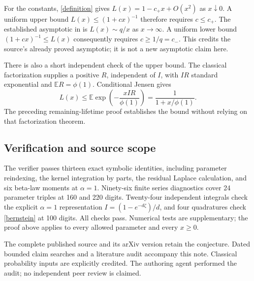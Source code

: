 \documentclass[11pt]{article}
\newcommand{\EE}{\mathbb E}
\begin{document}
For the constants, \eqref{definition} gives
$L(x)=1-c_+x+O(x^2)$ as $x\downarrow0$. A uniform upper bound
$L(x)\leq(1+cx)^{-1}$ therefore requires $c\leq c_+$.
The established asymptotic in \cite[Proposition 6]{BS} is
$L(x)\sim q/x$ as $x\to\infty$. A uniform lower bound
$(1+cx)^{-1}\leq L(x)$ consequently requires $c\geq1/q=c_-$.
This credits the source's already proved asymptotic; it is not a
new asymptotic claim here.

There is also a short independent check of the upper bound.
The classical factorization \cite[Theorem 2(ii)]{BY} supplies a
positive $R$, independent of $I$, with $IR$ standard exponential
and $\EE R=\phi(1)$. Conditional Jensen gives
\[
 L(x)\leq\EE\exp\left(-\frac{xIR}{\phi(1)}\right)
          =\frac1{1+x/\phi(1)}.
\]
The preceding remaining-lifetime proof establishes the bound
without relying on that factorization theorem.

\subsection*{Verification and source scope}
The verifier passes thirteen exact symbolic identities, including
parameter reindexing, the kernel integration by parts, the residual
Laplace calculation, and six beta-law moments at $\alpha=1$.
Ninety-six finite series diagnostics cover 24 parameter triples
at 160 and 220 digits. Twenty-four independent integrals check the
explicit $\alpha=1$ representation
$I=(1-e^{-d\zeta})/d$, and four quadratures check
\eqref{bernstein} at 100 digits. All checks pass. Numerical tests
are supplementary; the proof above applies to every allowed
parameter and every $x\geq0$.

The complete published source and its arXiv version retain the
conjecture. Dated bounded claim searches and a literature audit
accompany this note. Classical probability inputs are explicitly
credited. The authoring agent performed the audit; no independent
peer review is claimed.

\newpage
\end{document}
